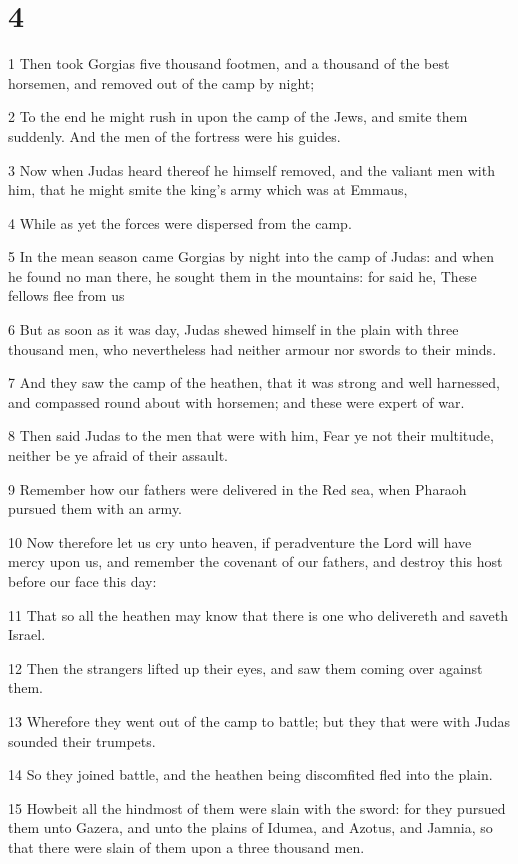 \chapter{4}

\par 1 Then took Gorgias five thousand footmen, and a thousand of the best horsemen, and removed out of the camp by night;
\par 2 To the end he might rush in upon the camp of the Jews, and smite them suddenly. And the men of the fortress were his guides.
\par 3 Now when Judas heard thereof he himself removed, and the valiant men with him, that he might smite the king's army which was at Emmaus,
\par 4 While as yet the forces were dispersed from the camp.
\par 5 In the mean season came Gorgias by night into the camp of Judas: and when he found no man there, he sought them in the mountains: for said he, These fellows flee from us
\par 6 But as soon as it was day, Judas shewed himself in the plain with three thousand men, who nevertheless had neither armour nor swords to their minds.
\par 7 And they saw the camp of the heathen, that it was strong and well harnessed, and compassed round about with horsemen; and these were expert of war.
\par 8 Then said Judas to the men that were with him, Fear ye not their multitude, neither be ye afraid of their assault.
\par 9 Remember how our fathers were delivered in the Red sea, when Pharaoh pursued them with an army.
\par 10 Now therefore let us cry unto heaven, if peradventure the Lord will have mercy upon us, and remember the covenant of our fathers, and destroy this host before our face this day:
\par 11 That so all the heathen may know that there is one who delivereth and saveth Israel.
\par 12 Then the strangers lifted up their eyes, and saw them coming over against them.
\par 13 Wherefore they went out of the camp to battle; but they that were with Judas sounded their trumpets.
\par 14 So they joined battle, and the heathen being discomfited fled into the plain.
\par 15 Howbeit all the hindmost of them were slain with the sword: for they pursued them unto Gazera, and unto the plains of Idumea, and Azotus, and Jamnia, so that there were slain of them upon a three thousand men.
